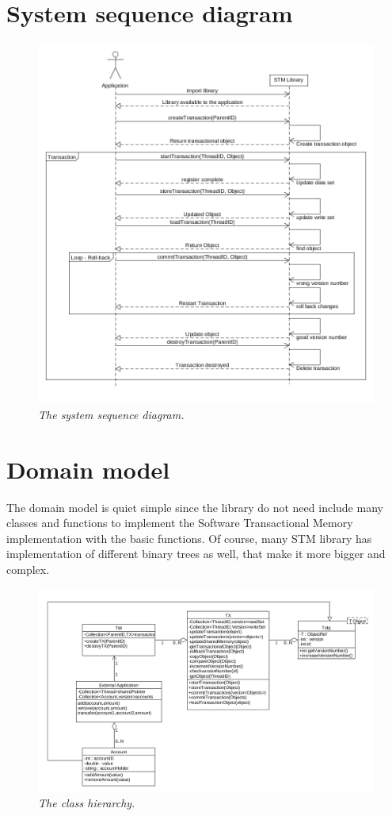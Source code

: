 \documentclass[12pt]{article}
\begin{document}
\newpage
\section{System sequence diagram}
\begin{figure}[h!]
\centering
\includegraphics[scale=0.45]{Pictures/sequence.png}
\caption{\textit{\color{gray}The system sequence diagram.}}
\end{figure}

\newpage
\section{Domain model}
The domain model is quiet simple since the library do not need include many classes and functions to implement the Software Transactional Memory implementation with the basic functions. Of course, many STM library has implementation of different binary trees as well, that make it more bigger and complex. 
\begin{figure}[h!]
\centering
\includegraphics[scale=0.25]{Pictures/domainModel.png}
\caption{\textit{\color{gray}The class hierarchy.}}
\end{figure}
\end{document}
